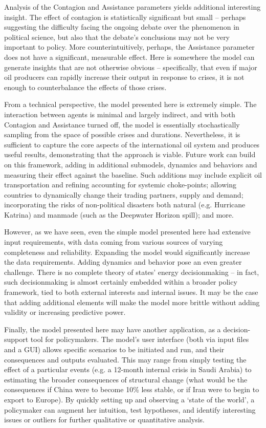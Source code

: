 \documentclass{article}
\begin{document}
Analysis of the Contagion and Assistance parameters yields additional interesting insight. The effect of contagion is statistically significant but small -- perhaps suggesting the difficulty facing the ongoing debate over the phenomenon in political science, but also that the debate's conclusions may not be very important to policy. More counterintuitively, perhaps, the Assistance parameter does not have a significant, measurable effect. Here is somewhere the model can generate insights that are not otherwise obvious -- specifically, that even if major oil producers can rapidly increase their output in response to crises, it is not enough to counterbalance the effects of those crises. 

From a technical perspective, the model presented here is extremely simple. The interaction between agents is minimal and largely indirect, and with both Contagion and Assistance turned off, the model is essentially stochastically sampling from the space of possible crises and durations. Nevertheless, it is sufficient to capture the core aspects of the international oil system and produces useful results, demonstrating that the approach is viable. Future work can build on this framework, adding in additional submodels, dynamics and behaviors and measuring their effect against the baseline. Such additions may include explicit oil transportation and refining accounting for systemic choke-points; allowing countries to dynamically change their trading partners, supply and demand; incorporating the risks of non-political disasters both natural (e.g. Hurricane Katrina) and manmade (such as the Deepwater Horizon spill); and more.

However, as we have seen, even the simple model presented here had extensive input requirements, with data coming from various sources of varying completeness and reliability. Expanding the model would significantly increase the data requirements. Adding dynamics and behavior pose an even greater challenge. There is no complete theory of states' energy decisionmaking -- in fact, such decisionmaking is almost certainly embedded within a broader policy framework, tied to both external interests and internal issues. It may be the case that adding additional elements will make the model more brittle without adding validity or increasing predictive power.

Finally, the model presented here may have another application, as a decision-support tool for policymakers. The model's user interface (both via input files and a GUI) allows specific scenarios to be initiated and run, and their consequences and outputs evaluated. This may range from simply testing the effect of a particular events (e.g. a 12-month internal crisis in Saudi Arabia) to estimating the broader consequences of structural change (what would be the consequences if China were to become 10\% less stable, or if Iran were to begin to export to Europe). By quickly setting up and observing a `state of the world', a policymaker can augment her intuition, test hypotheses, and identify interesting issues or outliers for further qualitative or quantitative analysis. 

\singlespacing


\end{document}
